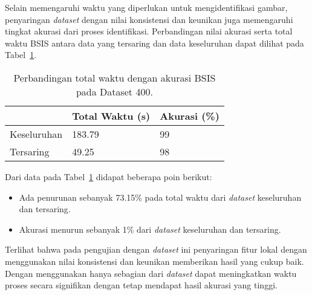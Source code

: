 Selain memengaruhi waktu yang diperlukan untuk mengidentifikasi gambar, penyaringan \textit{dataset} dengan nilai konsistensi dan keunikan juga memengaruhi tingkat akurasi dari proses identifikasi. Perbandingan nilai akurasi serta total waktu BSIS antara data yang tersaring dan data keseluruhan dapat dilihat pada Tabel~\ref{tab:waktu_akurasi_dataset400}.
\begin{table}[H]
	\centering
	\begin{tabular}{|l|l|l|}
		\hline
		& \textbf{Total Waktu (s)} & \textbf{Akurasi (\%)} \\ \hline
		Keseluruhan & 183.79                   & 99                    \\ \hline
		Tersaring   & 49.25                    & 98                    \\ \hline
	\end{tabular}
	\caption{Perbandingan total waktu dengan akurasi BSIS pada Dataset 400.}
	\label{tab:waktu_akurasi_dataset400}
\end{table}
Dari data pada Tabel~\ref{tab:waktu_akurasi_dataset400} didapat beberapa poin berikut:
\begin{itemize}
	\item Ada penurunan sebanyak 73.15\% pada total waktu dari \textit{dataset} keseluruhan dan tersaring.
	\item Akurasi menurun sebanyak 1\% dari \textit{dataset} keseluruhan dan tersaring.
\end{itemize}
Terlihat bahwa pada pengujian dengan \textit{dataset} ini penyaringan fitur lokal dengan menggunakan nilai konsistensi dan keunikan memberikan hasil yang cukup baik. Dengan menggunakan hanya sebagian dari \textit{dataset} dapat meningkatkan waktu proses secara signifikan dengan tetap mendapat hasil akurasi yang tinggi.

